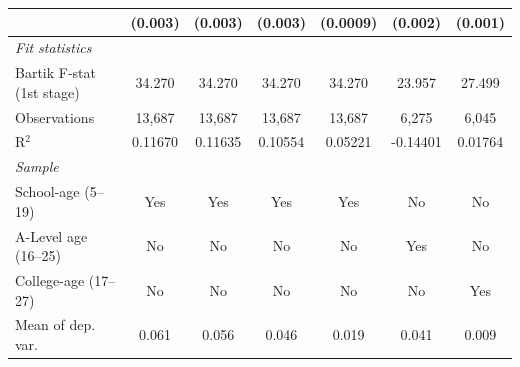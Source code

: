 \begin{tabular}{lcccccc}
                                                                  & (0.003)       & (0.003)                   & (0.003)                     & (0.0009)                              & (0.002)                       & (0.001)\\   
   \midrule
   \emph{Fit statistics}\\
   Bartik F-stat (1st stage)                                  & 34.270        & 34.270                    & 34.270                      & 34.270                                & 23.957                        & 27.499\\  
   Observations                                                   & 13,687        & 13,687                    & 13,687                      & 13,687                                & 6,275                         & 6,045\\  
   R$^2$                                                          & 0.11670       & 0.11635                   & 0.10554                     & 0.05221                               & -0.14401                      & 0.01764\\  
\midrule
\emph{Sample}\\
School-age (5--19) & Yes & Yes & Yes & Yes & No & No   \\   
A-Level age (16--25) & No & No & No & No & Yes & No   \\   
College-age (17--27) & No & No & No & No & No & Yes   \\   
   Mean of dep. var.                                              & 0.061         & 0.056                     & 0.046                       & 0.019                                 & 0.041                         & 0.009\\  
\bottomrule
\end{tabular}

